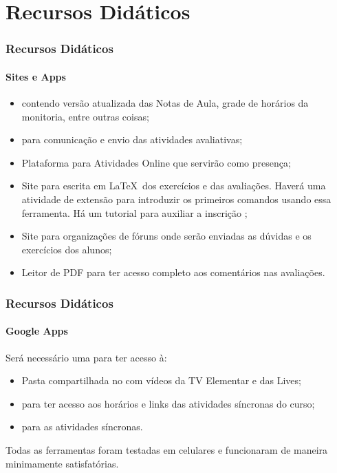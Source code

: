 \section{Recursos Didáticos}


\begin{frame}
    \frametitle{Recursos Didáticos}
    \framesubtitle{Sites e Apps}

    \begin{itemize}
        \item {} contendo versão atualizada das Notas de Aula, grade de horários da monitoria, entre outras coisas; \pause 
        \item {} para comunicação e envio das atividades avaliativas; \pause
        \item Plataforma  para Atividades Online que servirão como presença; \pause
        \item Site  para escrita em \LaTeX~dos exercícios e das avaliações. Haverá uma atividade de extensão para introduzir os primeiros comandos usando essa ferramenta. Há um tutorial para auxiliar a inscrição ; \pause
        \item Site  para organizações de fóruns onde serão enviadas as dúvidas e os exercícios dos alunos; \pause
        \item Leitor de PDF  para ter acesso completo aos comentários nas avaliações.

    \end{itemize}
\end{frame}

\begin{frame}
    \frametitle{Recursos Didáticos}
    \framesubtitle{Google Apps}
    
    Será necessário uma  para ter acesso à:
        \begin{itemize}
            \item Pasta compartilhada no  com vídeos da TV Elementar e das Lives; \pause
            \item {} para ter acesso aos horários e links das atividades síncronas do curso; \pause
            \item {} para as atividades síncronas.\pause
        \end{itemize}
    
    \begin{observacao*}
        Todas as ferramentas foram testadas em celulares e funcionaram de maneira minimamente satisfatórias.
    \end{observacao*}
    

\end{frame}